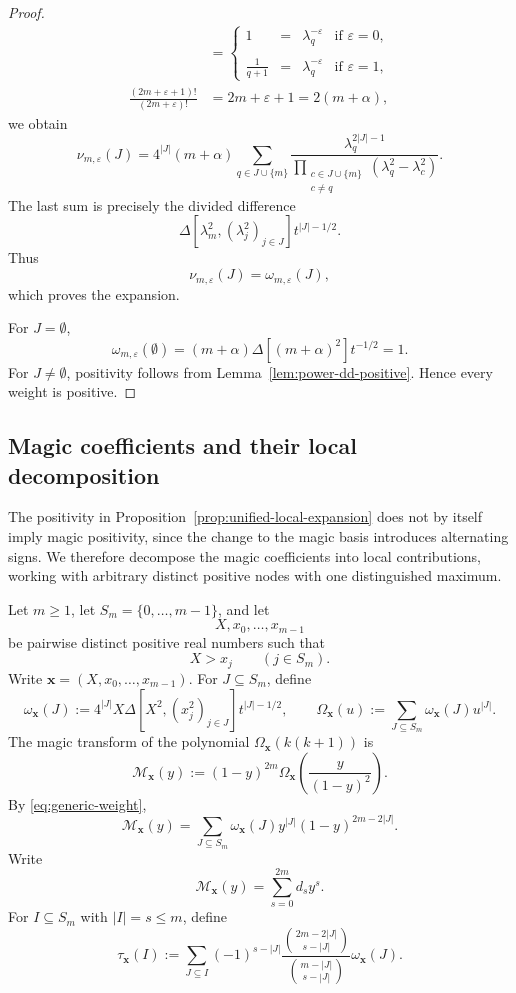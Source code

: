 \documentclass[12pt]{amsart}
\theoremstyle{definition}
\newcommand{\DD}{\Delta}
\begin{document}
\begin{proof}
\[\begin{aligned}
&=
\left\{
\begin{array}{cccc}
1 &=&\lambda_q^{-\varepsilon} & \mbox{if } \varepsilon=0,\\
\\
\frac{1}{q+1}&=&\lambda_q^{-\varepsilon}& \mbox{if } \varepsilon=1,
\end{array}
\right.
\\
\frac{(2m+\varepsilon+1)!}{(2m+\varepsilon)!}
&=
2m+\varepsilon+1=
2(m+\alpha),
\end{aligned}
\]
we obtain
\[
\nu_{m,\varepsilon}(J)
=
4^{|J|}(m+\alpha)
\sum_{q\in  J \cup \{m\}}
\frac{\lambda_q^{2|J|-1}}
{\displaystyle
\prod_{\substack{c\in  J \cup \{m\}\\c\ne q}}
(\lambda_q^2-\lambda_c^2)}.
\]
The last sum is precisely the divided difference
\[
\DD[\lambda_m^2,(\lambda_j^2)_{j\in J}]
t^{|J|-1/2}.
\]
Thus
\[
\nu_{m,\varepsilon}(J)=\omega_{m,\varepsilon}(J),
\]
which proves the expansion.

For $J=\emptyset$,
\[
\omega_{m,\varepsilon}(\emptyset)
=
(m+\alpha)\DD[(m+\alpha)^2]t^{-1/2}=1.
\]
For $J\ne\emptyset$, positivity follows from
Lemma~\ref{lem:power-dd-positive}.  Hence every weight is positive.
\end{proof}


\subsection{Magic coefficients and their local decomposition}\label{sec:magic-local}

The positivity in Proposition~\ref{prop:unified-local-expansion}
does not by itself imply magic positivity, since the change to the
magic basis introduces alternating signs.
We therefore decompose the magic coefficients into local contributions,
working with arbitrary distinct positive nodes with one distinguished
maximum.

Let $m\ge1$, let $S_m=\{0,\ldots,m-1\}$, and let
\[
X,x_0,\ldots,x_{m-1}
\]
be pairwise distinct positive real numbers such that
\[
X>x_j
\qquad(j\in S_m).
\]
Write $\mathbf x=(X,x_0,\ldots,x_{m-1})$.
For $J\subseteq S_m$, define
\begin{equation}\label{eq:generic-weight}
\omega_{\mathbf x}(J)
:=
4^{|J|}X
\DD[X^2,(x_j^2)_{j\in J}]t^{|J|-1/2},
\qquad
\Omega_{\mathbf x}(u)
:=
\sum_{J\subseteq S_m}\omega_{\mathbf x}(J)u^{|J|}.
\end{equation}
The magic transform of the polynomial
$\Omega_{\mathbf x}(k(k+1))$ is
\[
\mathcal M_{\mathbf x}(y)
:=
(1-y)^{2m}
\Omega_{\mathbf x}\left(\frac{y}{(1-y)^2}\right).
\]
By \eqref{eq:generic-weight},
\begin{equation}\label{eq:generic-M}
\mathcal M_{\mathbf x}(y)
=
\sum_{J\subseteq S_m}
\omega_{\mathbf x}(J)y^{|J|}(1-y)^{2m-2|J|}.
\end{equation}
Write
\[
\mathcal M_{\mathbf x}(y)
=
\sum_{s=0}^{2m}d_s y^s.
\]
For $I\subseteq S_m$ with $|I|=s\le m$, define
\begin{equation}\label{eq:generic-tau}
\tau_{\mathbf x}(I)
:=
\sum_{J\subseteq I}
(-1)^{s-|J|}
\frac{\binom{2m-2|J|}{s-|J|}}
{\binom{m-|J|}{s-|J|}}
\omega_{\mathbf x}(J).
\end{equation}
\end{document}
